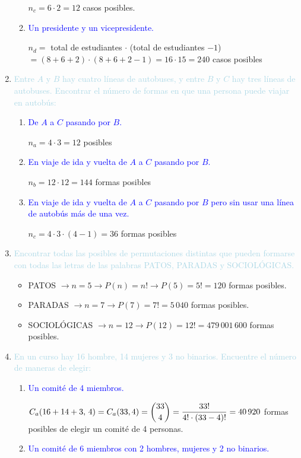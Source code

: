 \documentclass{article}
\newcommand{\lb}[1]{\textcolor{lightblue}{#1}}
\newcommand{\db}[1]{\textcolor{blue}{#1}}
\begin{document}
\begin{enumerate}[label=\color{red}\textbf{\arabic*)}, leftmargin=*]
\begin{enumerate}[label=\color{red}\alph*)]
        $n_c=6\cdot2=12$ casos posibles.
        \item \db{Un presidente y un vicepresidente.}
        
        $n_d=$ total de estudiantes $\cdot$ (total de estudiantes $- 1$) $=(8+6+2)\cdot(8+6+2-1)=16\cdot15=240$ casos posibles
    \end{enumerate}
    \item \lb{Entre $A$ y $B$ hay cuatro líneas de autobuses, y entre $B$ y $C$ hay tres líneas de autobuses. Encontrar el número de formas en que una persona puede viajar en autobús:}
    \begin{enumerate}[label=\color{red}\alph*)]
        \item \db{De $A$ a $C$ pasando por $B$.}
        
        $n_a=4\cdot3=12$ posibles
        \item \db{En viaje de ida y vuelta de $A$ a $C$ pasando por $B$.}
        
        $n_b=12\cdot12=144$ formas posibles
        \item \db{En viaje de ida y vuelta de $A$ a $C$ pasando por $B$ pero sin usar una línea de autobús más de una vez.}
        
        $n_c=4\cdot 3\cdot(4-1)=36$ formas posibles
    \end{enumerate}
    \item \lb{Encontrar todas las posibles de permutaciones distintas que pueden formarse con todas las letras de las palabras PATOS, PARADAS y SOCIOLÓGICAS.}
    \begin{itemize}[label=$-$]
    \item PATOS $\longrightarrow n=5\longrightarrow P(n)=n!\longrightarrow P(5)=5!=120$ formas posibles.
    \item PARADAS $\longrightarrow n=7\longrightarrow P(7)=7!=5\,040$ formas posibles.
    \item SOCIOLÓGICAS $\longrightarrow n=12\longrightarrow P(12)=12!=479\,001\,600$ formas posibles.
    \end{itemize}
    
    \item \lb{En un curso hay 16 hombre, 14 mujeres y 3 no binarios. Encuentre el número de maneras de elegir:}
    \begin{enumerate}[label=\color{red}\alph*)]
    	\item \db{Un comité de 4 miembros.}
        
        $C_a(16+14+3,\,4)=C_a(33,4)=\dbinom{33}{4}=\dfrac{33!}{4!\cdot(33-4)!}=40\,920$ formas posibles de elegir un comité de 4 personas.
        \item \db{Un comité de 6 miembros con 2 hombres, mujeres y 2 no binarios.}
        

\end{enumerate}
\end{enumerate}
\end{document}
